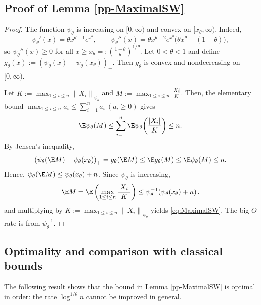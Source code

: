 \documentclass[11pt]{article}
\providecommand{\paren}[1]{\left(#1\right)}
\renewcommand{\norm}[1]{\left\|#1\right\|}
\renewcommand{\abs}[1]{\left|#1\right|}
\begin{document}
\subsection{Proof of Lemma \ref{pp-MaximalSW}}
\begin{proof}
The function $\psi_\theta$ is increasing on $[0,\infty)$ and convex on $[x_\theta,\infty)$.
Indeed,
\[
\psi_\theta'(x)=\theta x^{\theta-1}e^{x^\theta},
\qquad
\psi_\theta''(x)=\theta x^{\theta-2}e^{x^\theta}\bigl(\theta x^\theta-(1-\theta)\bigr),
\]
so $\psi_\theta''(x)\ge 0$ for all $x\ge x_\theta=:\paren{\frac{1-\theta}{\theta}}^{1/\theta}$. 
Let $0<\theta<1$ and define $
g_\theta(x):=\paren{\psi_\theta(x)-\psi_\theta(x_\theta)}_+$.
Then $g_\theta$ is convex and nondecreasing on $[0,\infty)$. 

Let $K:=\max_{1\le i\le n}\norm{X_i}_{\psi_\theta}$ and $M:=\max_{1\le i\le n}\frac{\abs{X_i}}{K}$.
Then, the elementary bound
$\max_{1\le i\le n} a_i \le \sum_{i=1}^n a_i~(a_i\ge 0)$ gives
\[
\E \psi_\theta(M)\le \sum_{i=1}^n \E \psi_\theta\!\paren{\frac{\abs{X_i}}{K}}\le n.
\]
By Jensen's inequality,
\[
\paren{\psi_\theta(\E M)-\psi_\theta(x_\theta)}_+= g_\theta(\E M)\le \E g_\theta(M)\le \E\psi_\theta(M)\le n.
\]
Hence,
$\psi_\theta(\E M)\le \psi_\theta(x_\theta)+n$. Since $\psi_\theta$ is increasing,
\[
\E M=\E \paren{\max_{1\le i\le n}\frac{\abs{X_i}}{K}}\le \psi_\theta^{-1}\!\paren{\psi_\theta(x_\theta)+n},
\]
and multiplying by $K:=\max_{1\le i\le n}\norm{X_i}_{\psi_\theta}$ yields \eqref{eq:MaximalSW}. The big-$O$ rate is from $\psi_\theta^{-1}$.
\end{proof}


\subsection{Optimality and comparison with classical bounds}\label{app:sec2}

The following result shows that the bound in Lemma \ref{pp-MaximalSW} is optimal in order: the rate $\log^{1/\theta} n$ cannot be improved in general.   
\end{document}
